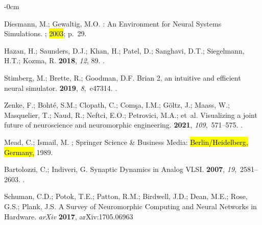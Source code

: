 \documentclass[brainsci, %
               review,accept,pdftex,moreauthors
               ]{Definitions/mdpi}
\begin{document}
\begin{adjustwidth}{-\extralength}{0cm}
\begin{thebibliography}{999}
Diesmann, M.; Gewaltig, M.O.
: {An} {Environment} for {Neural} {Systems} {Simulations}.
; {
  \hl{2003}}; %
 p.~29.

Hazan, H.; Saunders, D.J.; Khan, H.; Patel, D.; Sanghavi, D.T.; Siegelmann,
  H.T.; Kozma, R.
\newblock {}
 {\bf 2018}, {\em 12}, 89.
.

Stimberg, M.; Brette, R.; Goodman, D.F.
\newblock Brian 2, an intuitive and efficient neural simulator.
 {\bf 2019}, {\em 8},~e47314.
.

Zenke, F.; Bohté, S.M.; Clopath, C.; Comşa, I.M.; Göltz, J.; Maass, W.;
  Masquelier, T.; Naud, R.; Neftci, E.O.; Petrovici, M.A.;  et~al.
\newblock Visualizing a joint future of neuroscience and neuromorphic
  engineering.
 {\bf 2021}, {\em 109},~571--575.
.

Mead, C.; Ismail, M.
; Springer
  Science \& Business Media:  \hl{Berlin/Heidelberg, Germany,} %
  1989.

Bartolozzi, C.; Indiveri, G.
\newblock Synaptic {Dynamics} in {Analog} {VLSI}.
 {\bf 2007}, {\em 19},~2581--2603.\linebreak
{}.

Schuman, C.D.; Potok, T.E.; Patton, R.M.; Birdwell, J.D.; Dean, M.E.; Rose,
  G.S.; Plank, J.S.
\newblock A {Survey} of {Neuromorphic} {Computing} and {Neural} {Networks} in
  {Hardware}. \emph{arXiv} {\bf 2017}, arXiv:1705.06963


\end{thebibliography}
\end{adjustwidth}
\end{document}
